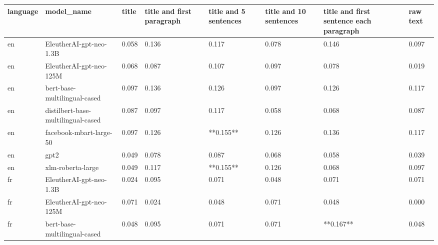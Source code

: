 \begin{tabular}{llllllll}
\toprule
language &                         model\_name &     title & title and first paragraph & title and 5 sentences & title and 10 sentences & title and first sentence each paragraph &  raw text \\
\midrule
      en &            EleutherAI-gpt-neo-1.3B &     0.058 &                     0.136 &                 0.117 &                  0.078 &                                   0.146 &     0.097 \\
      en &            EleutherAI-gpt-neo-125M &     0.068 &                     0.087 &                 0.107 &                  0.097 &                                   0.078 &     0.019 \\
      en &       bert-base-multilingual-cased &     0.097 &                     0.136 &                 0.126 &                  0.097 &                                   0.126 &     0.117 \\
      en & distilbert-base-multilingual-cased &     0.087 &                     0.097 &                 0.117 &                  0.058 &                                   0.068 &     0.087 \\
      en &            facebook-mbart-large-50 &     0.097 &                     0.126 &             **0.155** &                  0.126 &                                   0.136 &     0.117 \\
      en &                               gpt2 &     0.049 &                     0.078 &                 0.087 &                  0.068 &                                   0.058 &     0.039 \\
      en &                  xlm-roberta-large &     0.049 &                     0.117 &             **0.155** &                  0.126 &                                   0.068 &     0.097 \\
      fr &            EleutherAI-gpt-neo-1.3B &     0.024 &                     0.095 &                 0.071 &                  0.048 &                                   0.071 &     0.071 \\
      fr &            EleutherAI-gpt-neo-125M &     0.071 &                     0.024 &                 0.048 &                  0.071 &                                   0.048 &     0.000 \\
      fr &       bert-base-multilingual-cased &     0.048 &                     0.095 &                 0.071 &                  0.071 &                               **0.167** &     0.048 \\

\end{tabular}
